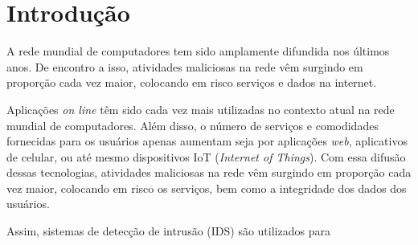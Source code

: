 \chapter[Introdução]{Introdução}
\label{introducao}
A rede mundial de computadores tem sido amplamente difundida nos últimos anos. De encontro a isso, atividades maliciosas na rede vêm surgindo em proporção cada vez maior, colocando em risco serviços e dados na internet. 

Aplicações \textit{on line} têm sido cada vez mais utilizadas no contexto atual na rede mundial de computadores. Além disso, o número de serviços e comodidades fornecidas para os usuários apenas aumentam seja por aplicações \textit{web}, aplicativos de celular, ou até mesmo dispositivos IoT (\textit{Internet of Things}). Com essa difusão dessas tecnologias, atividades maliciosas na rede vêm surgindo em proporção cada vez maior, colocando em risco os serviços, bem como a integridade dos dados dos usuários.     


Assim, sistemas de detecção de intrusão (IDS) são utilizados para 


